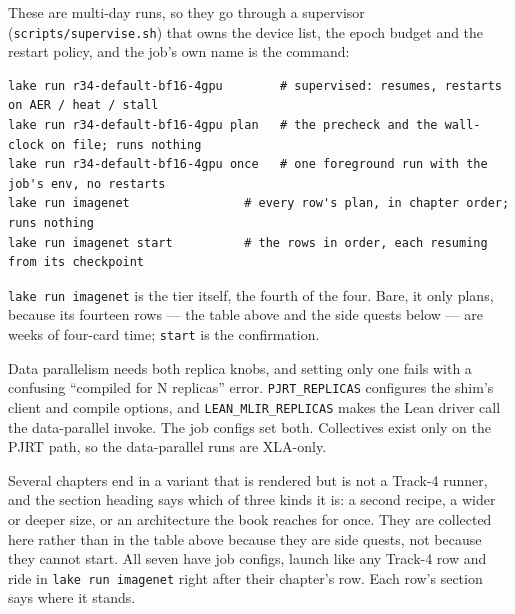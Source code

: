 
These are multi-day runs, so they go through a supervisor
(\texttt{scripts/supervise.sh}) that owns the device list, the epoch budget and
the restart policy, and the job's own name is the command:

\begin{verbatim}
lake run r34-default-bf16-4gpu        # supervised: resumes, restarts on AER / heat / stall
lake run r34-default-bf16-4gpu plan   # the precheck and the wall-clock on file; runs nothing
lake run r34-default-bf16-4gpu once   # one foreground run with the job's env, no restarts
lake run imagenet                # every row's plan, in chapter order; runs nothing
lake run imagenet start          # the rows in order, each resuming from its checkpoint
\end{verbatim}

\noindent \texttt{lake run imagenet} is the tier itself, the fourth of the four.
Bare, it only plans, because its fourteen rows --- the table above and the side
quests below --- are weeks of four-card time; \texttt{start} is the confirmation.

Data parallelism needs both replica knobs, and setting only one fails with a
confusing ``compiled for N replicas'' error. \texttt{PJRT\_REPLICAS} configures
the shim's client and compile options, and \texttt{LEAN\_MLIR\_REPLICAS} makes
the Lean driver call the data-parallel invoke. The job configs set
both. Collectives exist only on the PJRT path, so the data-parallel runs are
XLA-only.


Several chapters end in a variant that is rendered but is not a Track-4 runner,
and the section heading says which of three kinds it is: a second recipe, a
wider or deeper size, or an architecture the book reaches for once. They are
collected here rather than in the table above because they are side quests,
not because they cannot start. All seven have job configs, launch like
any Track-4 row and ride in \texttt{lake run imagenet} right after their
chapter's row. Each row's section says where it stands.

